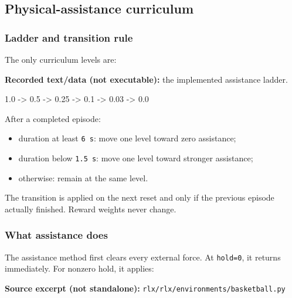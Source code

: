 \documentclass[
  american,
  11pt,
  letterpaper,
]{article}
\newenvironment{Shaded}{\begin{snugshade}}{\end{snugshade}}
\newcommand{\NormalTok}[1]{#1}
\providecommand{\tightlist}{%
  \setlength{\itemsep}{0pt}\setlength{\parskip}{0pt}}
\renewenvironment{Shaded}{\par\smallskip}{\par\smallskip}
\begin{document}
\subsection{Physical-assistance
curriculum}\label{physical-assistance-curriculum}

\subsubsection{Ladder and transition
rule}\label{ladder-and-transition-rule}

The only curriculum levels are:

\textbf{Recorded text/data (not executable):} the implemented assistance
ladder.

\begin{Shaded}
\begin{Highlighting}[]
\NormalTok{1.0 {-}\textgreater{} 0.5 {-}\textgreater{} 0.25 {-}\textgreater{} 0.1 {-}\textgreater{} 0.03 {-}\textgreater{} 0.0}
\end{Highlighting}
\end{Shaded}

After a completed episode:

\begin{itemize}
\tightlist
\item
  duration at least \texttt{6\ s}: move one level toward zero
  assistance;
\item
  duration below \texttt{1.5\ s}: move one level toward stronger
  assistance;
\item
  otherwise: remain at the same level.
\end{itemize}

The transition is applied on the next reset and only if the previous
episode actually finished. Reward weights never change.

\subsubsection{What assistance does}\label{what-assistance-does}

The assistance method first clears every external force. At
\texttt{hold=0}, it returns immediately. For nonzero hold, it applies:

\textbf{Source excerpt (not standalone):}
\texttt{rlx/\allowbreak{}rlx/\allowbreak{}environm\allowbreak{}ents/\allowbreak{}basketba\allowbreak{}ll.py}
\end{document}
